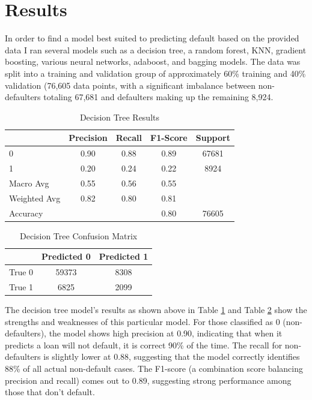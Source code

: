 \documentclass[12pt]{article}
\begin{document}
\section{Results}
\label{sec:resu}

In order to find a model best suited to predicting default based on the provided data I ran several models such as a decision tree, a random forest, KNN, gradient boosting, various neural networks, adaboost, and bagging models. The data was split into a training and validation group of approximately 60\% training and 40\% validation (76,605 data points, with a significant imbalance between non-defaulters totaling 67,681 and defaulters making up the remaining 8,924.

\begin{table}[htbp]
    \centering
    \caption{Decision Tree Results}
    \begin{tabular}{lcccc}
        \toprule
        & Precision & Recall & F1-Score & Support \\
        \midrule
        0 & 0.90 & 0.88 & 0.89 & 67681 \\
        1 & 0.20 & 0.24 & 0.22 & 8924 \\
        Macro Avg & 0.55 & 0.56 & 0.55 & \\
        Weighted Avg & 0.82 & 0.80 & 0.81 & \\
        \midrule
        Accuracy & & & 0.80 & 76605 \\
        \bottomrule
    \end{tabular}
    \label{table:decisionTreeResults}
\end{table}

\begin{table}[htbp]
    \centering
    \caption{Decision Tree Confusion Matrix}
    \begin{tabular}{lcc}
        \toprule
        & Predicted 0 & Predicted 1 \\
        \midrule
        True 0 & 59373 & 8308 \\
        True 1 & 6825 & 2099 \\
        \bottomrule
    \end{tabular}
    \label{table:decisionTreeConfusionMatrix}
\end{table}

The decision tree model's results as shown above in Table \ref{table:decisionTreeResults} and Table \ref{table:decisionTreeConfusionMatrix} show the strengths and weaknesses of this particular model. For those classified as 0 (non-defaulters), the model shows high precision at 0.90, indicating that when it predicts a loan will not default, it is correct 90\% of the time. The recall for non-defaulters is slightly lower at 0.88, suggesting that the model correctly identifies 88\% of all actual non-default cases. The F1-score (a combination score balancing precision and recall) comes out to 0.89, suggesting strong performance among those that don't default.
\end{document}
